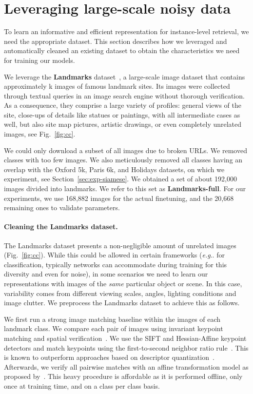 \documentclass[twocolumn]{svjour3}          \smartqed  \usepackage{graphicx}
\makeatletter
\DeclareRobustCommand\onedot{\futurelet\@let@token\@onedot}
\def\@onedot{\ifx\@let@token.\else.\null\fi\xspace}
\def\eg{\emph{e.g}\onedot} \def\Eg{\emph{E.g}\onedot}
\makeatother
\begin{document}
\section{Leveraging large-scale noisy data}
\label{sec:cleaning}

To learn an informative and efficient representation for
instance-level retrieval, we need the appropriate dataset. This
section describes how we leveraged and
automatically cleaned an existing dataset to obtain the
characteristics we need for training our models.

We leverage the \textbf{Landmarks} dataset~\citep{Babenko2014}, a large-scale image dataset that contains approximately k images of  famous landmark sites.  Its images were collected through
textual queries in an image search engine without thorough verification.  As a consequence, they comprise a large variety of profiles: general views of the site, close-ups of details like statues
or paintings, with all intermediate cases as well, but also site map pictures, artistic drawings, or even completely unrelated images, see Fig.~\ref{fig:cc}.

We could only download a subset of all images due to broken URLs. We removed classes with too few
images. We also meticulously removed all classes having an overlap
with the Oxford 5k, Paris 6k, and Holidays datasets, on which we
experiment, see Section~\ref{sec:exp-siamese}.  We obtained a set of about
192,000 images divided into  landmarks.  We refer to this set as
\textbf{Landmarks-full}.  For our experiments, we use 168,882 images
for the actual finetuning, and the 20,668 remaining ones to validate
parameters.

\paragraph{Cleaning the Landmarks dataset.} The
Landmarks dataset presents a non-negligible amount of unrelated images (Fig.~\ref{fig:cc}). While this could be allowed 
in certain frameworks (\eg for classification, typically networks can
accommodate during training for this diversity and even for noise), in
some scenarios we need to learn our representations with images of
the \emph{same} particular object or scene. In this case, variability comes
from different viewing scales, angles, lighting conditions and image
clutter. We preprocess the Landmarks dataset to achieve this as
follows.



We first run a strong image
matching baseline within the images of each landmark class.  We compare each pair of images using invariant keypoint
matching and spatial verification~\citep{Lowe2004}. We use the SIFT and Hessian-Affine keypoint detectors
\citep{Lowe2004,Mikolajczyk2004} and match keypoints using the first-to-second neighbor ratio rule~\citep{Lowe2004}. This is known
to outperform approaches based on descriptor quantization~\citep{Philbin2010}. Afterwards, we verify all pairwise matches with an
affine transformation model as proposed by~\cite{Philbin2007}. This heavy procedure is affordable as it is performed offline, only once at training time, and on a class per class basis. 
\end{document}
